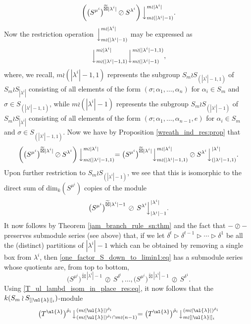 \[\left(\bigl(S^{\mu^i}\bigr)^{\widetilde\boxtimes |\lambda^i|}\oslash S^{\lambda^i}\right)\Bigl\downarrow^{m \wr |\lambda^i|}_{m \wr (|\lambda^i|-1)}.\]
Now the restriction operation $\Bigl\downarrow^{m \wr |\lambda^i|}_{m \wr (|\lambda^i|-1)}$ may be expressed as
\[\Bigl\downarrow^{m \wr |\lambda^i|}_{m \wr (|\lambda^i|-1,1)}\Bigl\downarrow^{m \wr (|\lambda^i|-1,1)}_{m \wr (|\lambda^i|-1)},\]
where, we recall, $m \wr (|\lambda^i|-1,1)$ represents the subgroup $S_m \wr S_{(|\lambda^i|-1,1)}$ of $S_m \wr S_{|\lambda^i|}$ consisting of all
elements of the form $(\sigma;\alpha_1,\ldots,\alpha_n)$ for $\alpha_i \in S_m$ and $\sigma \in S_{(|\lambda^i|-1,1)}$, while
$m \wr (|\lambda^i|-1)$ represents the subgroup $S_m \wr S_{(|\lambda^i|-1)}$ of $S_m \wr S_{|\lambda^i|}$ consisting of all elements of the form
$(\sigma;\alpha_1,\ldots,\alpha_{n-1},e)$ for $\alpha_i \in S_m$ and $\sigma \in S_{(|\lambda^i|-1,1)}$. Now we have by
Proposition \ref{wreath_ind_res:prop} that
\[
\left(\bigl(S^{\mu^i}\bigr)^{\widetilde\boxtimes |\lambda^i|}\oslash S^{\lambda^i}\right)\Bigl\downarrow^{m \wr |\lambda^i|}_{m \wr (|\lambda^i|-1,1)}
=
\bigl(S^{\mu^i}\bigr)^{\widetilde\boxtimes |\lambda^i|}\Bigl\downarrow^{m \wr |\lambda^i|}_{m \wr (|\lambda^i|-1,1)}\:\oslash\:
S^{\lambda^i}\Bigl\downarrow^{|\lambda^i|}_{(|\lambda^i|-1,1)}.
\]
Upon further restriction to $S_m \wr S_{(|\lambda^i|-1)}$, we see that this is isomorphic to the direct sum of $\mathrm{dim}_k(S^{\mu^i})$
copies of the module
\begin{equation}\label{one_factor_S_down_to_limin1:eq}
\bigl(S^{\mu^i}\bigr)^{\widetilde\boxtimes |\lambda^i|-1}\,\oslash\,S^{\lambda^i}\!\Bigl\downarrow^{|\lambda^i|}_{|\lambda^i|-1}.
\end{equation}
It now follows by Theorem \ref{jam_branch_rule_sn:thm} and the fact that $- \oslash -$ preserves submodule series (see above)
that, if we let $\delta^{t} \triangleright \delta^{t-1} \triangleright \cdots \triangleright \delta^{1}$ be all the (distinct) partitions
of $|\lambda^i|-1$ which can be obtained by removing a single box from $\lambda^i$, then \eqref{one_factor_S_down_to_limin1:eq} has a
submodule series whose quotients are, from top to bottom,
\[
\bigl(S^{\mu^i}\bigr)^{\widetilde\boxtimes |\lambda^i|-1}\,\oslash\,S^{\delta^{t}},\ldots,
\bigl(S^{\mu^i}\bigr)^{\widetilde\boxtimes |\lambda^i|-1}\,\oslash\,S^{\delta^{1}}.
\]
Using \eqref{T_ul_lambd_isom_in_place_res:eq}, it now follows that the $k(S_m \wr S_{[|\ul{\lambda}|]_i})$-module
\[\bigl(T^{\ul{\lambda}}\bigr)^{\hat\rho_i}\bigl\downarrow^{(m{\wr}|\ul{\lambda}|)^{\hat\rho_i}}_{(m{\wr}|\ul{\lambda}|)^{\hat\rho_i} \cap m \wr (n-1)}
=
\bigl(T^{\ul{\lambda}}\bigr)^{\hat\rho_i}\bigl\downarrow^{(m{\wr}|\ul{\lambda}|)^{\hat\rho_i}}_{m \wr [|\ul{\lambda}|]_i}\]
